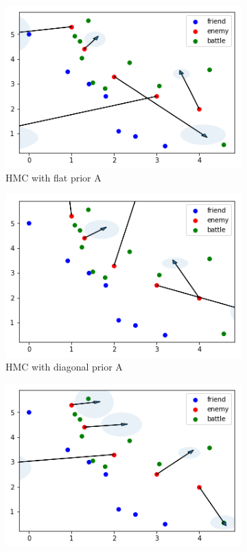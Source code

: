 \documentclass{article}
\begin{document}
\begin{figure}[h!]
  \begin{subfigure}[b]{0.45\linewidth}
    \includegraphics[width=\linewidth]{Sampling31.png}
    \caption{HMC with flat prior A}
  \end{subfigure}
  \begin{subfigure}[b]{0.45\linewidth}
    \includegraphics[width=\linewidth]{Sampling32.png}
    \caption{HMC with diagonal prior A}
  \end{subfigure}
  \begin{subfigure}[b]{0.45\linewidth}
    \includegraphics[width=\linewidth]{Sampling41.png}

\end{subfigure}
\end{figure}
\end{document}
